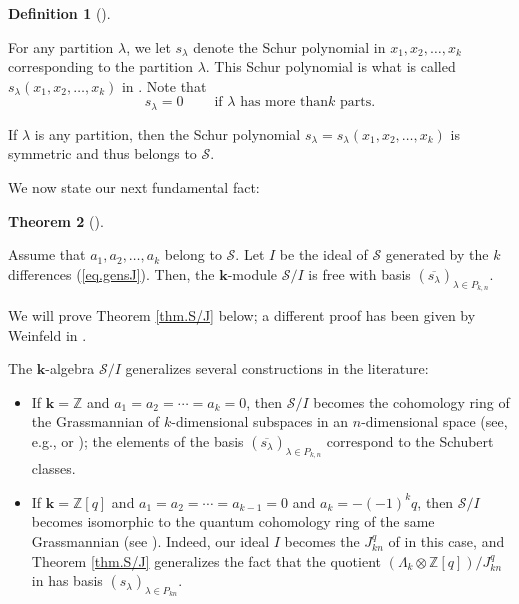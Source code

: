 \documentclass[numbers=enddot,12pt,final,onecolumn,notitlepage]{scrartcl}%
\theoremstyle{definition}
\newtheorem{theo}{Theorem}[section]
\newenvironment{theorem}[1][]
{\begin{theo}[#1]\begin{leftbar}}
{\end{leftbar}\end{theo}}
\newtheorem{defi}[theo]{Definition}
\newenvironment{definition}[1][]
{\begin{defi}[#1]\begin{leftbar}}
{\end{leftbar}\end{defi}}
\begin{document}
\begin{definition}
\label{def.slam}For any partition $\lambda$, we let $s_{\lambda}$ denote the
Schur polynomial in $x_{1},x_{2},\ldots,x_{k}$ corresponding to the partition
$\lambda$. This Schur polynomial is what is called $s_{\lambda}\left(
x_{1},x_{2},\ldots,x_{k}\right)  $ in \cite[Chapter 2]{GriRei18}. Note that%
\begin{equation}
s_{\lambda}=0\ \ \ \ \ \ \ \ \ \ \text{if }\lambda\text{ has more than
}k\text{ parts.} \label{eq.slam=0-too-long}%
\end{equation}

\end{definition}

If $\lambda$ is any partition, then the Schur polynomial $s_{\lambda
}=s_{\lambda}\left(  x_{1},x_{2},\ldots,x_{k}\right)  $ is symmetric and thus
belongs to $\mathcal{S}$.

We now state our next fundamental fact:


\begin{theorem}
\label{thm.S/J}Assume that $a_{1},a_{2},\ldots,a_{k}$ belong to $\mathcal{S}$.
Let $I$ be the ideal of $\mathcal{S}$ generated by the $k$ differences
(\ref{eq.gensJ}). Then, the $\mathbf{k}$-module $\mathcal{S}/I$ is free with
basis $\left(  \overline{s_{\lambda}}\right)  _{\lambda\in P_{k,n}}$.
\end{theorem}


We will prove Theorem \ref{thm.S/J} below; a different proof has been given by
Weinfeld in \cite[Corollary 6.2]{Weinfe19}.

The $\mathbf{k}$-algebra $\mathcal{S}/I$ generalizes several constructions in
the literature:

\begin{itemize}
\item If $\mathbf{k}=\mathbb{Z}$ and $a_{1}=a_{2}=\cdots=a_{k}=0$, then
$\mathcal{S}/I$ becomes the cohomology ring of the Grassmannian of
$k$-dimensional subspaces in an $n$-dimensional space (see, e.g.,
\cite[\S 9.4]{Fulton97} or \cite[Exercise 3.2.12]{Manive01}); the elements of
the basis $\left(  \overline{s_{\lambda}}\right)  _{\lambda\in P_{k,n}}$
correspond to the Schubert classes.

\item If $\mathbf{k}=\mathbb{Z}\left[  q\right]  $ and $a_{1}=a_{2}%
=\cdots=a_{k-1}=0$ and $a_{k}=-\left(  -1\right)  ^{k}q$, then $\mathcal{S}/I$
becomes isomorphic to the quantum cohomology ring of the same Grassmannian
(see \cite{Postni05}). Indeed, our ideal $I$ becomes the $J_{kn}^{q}$ of
\cite[(6)]{Postni05} in this case, and Theorem \ref{thm.S/J} generalizes the
fact that the quotient $\left(  \Lambda_{k}\otimes\mathbb{Z}\left[  q\right]
\right)  /J_{kn}^{q}$ in \cite[(6)]{Postni05} has basis $\left(  s_{\lambda
}\right)  _{\lambda\in P_{kn}}$.
\end{itemize}
\end{document}
